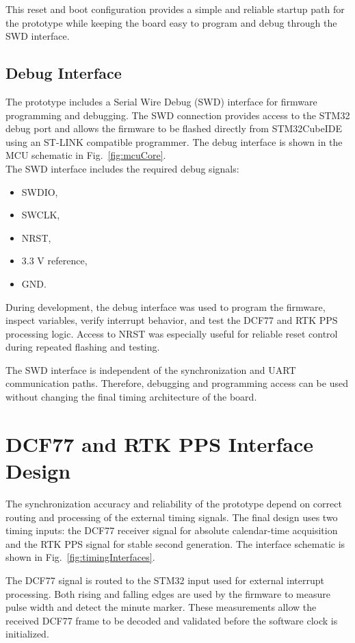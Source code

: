 This reset and boot configuration provides a simple and reliable startup path for the prototype while keeping the board easy to program and debug through the SWD interface.

\subsection{Debug Interface}

The prototype includes a Serial Wire Debug (SWD) interface for firmware programming and debugging. The SWD connection provides access to the STM32 debug port and allows the firmware to be flashed directly from STM32CubeIDE using an ST-LINK compatible programmer. The debug interface is shown in the MCU schematic in Fig.~\ref{fig:mcuCore}.
\\
The SWD interface includes the required debug signals:
\begin{itemize}
    \item SWDIO,
    \item SWCLK,
    \item NRST,
    \item 3.3 V reference,
    \item GND.
\end{itemize}

During development, the debug interface was used to program the firmware, inspect variables, verify interrupt behavior, and test the DCF77 and RTK PPS processing logic. Access to NRST was especially useful for reliable reset control during repeated flashing and testing.

The SWD interface is independent of the synchronization and UART communication paths. Therefore, debugging and programming access can be used without changing the final timing architecture of the board.

\section{DCF77 and RTK PPS Interface Design}

The synchronization accuracy and reliability of the prototype depend on correct routing and processing of the external timing signals. The final design uses two timing inputs: the DCF77 receiver signal for absolute calendar-time acquisition and the RTK PPS signal for stable second generation. The interface schematic is shown in Fig.~\ref{fig:timingInterfaces}.

The DCF77 signal is routed to the STM32 input used for external interrupt processing. Both rising and falling edges are used by the firmware to measure pulse width and detect the minute marker. These measurements allow the received DCF77 frame to be decoded and validated before the software clock is initialized.


